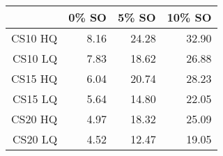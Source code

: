 \begin{table}[ht]
\begin{center}
\begin{tabular}{rrrr}
  \hline
 & 0\% SO & 5\% SO & 10\% SO \\
  \hline
CS10 HQ & 8.16 & 24.28 & 32.90 \\
  CS10 LQ & 7.83 & 18.62 & 26.88 \\
  CS15 HQ & 6.04 & 20.74 & 28.23 \\
  CS15 LQ & 5.64 & 14.80 & 22.05 \\
  CS20 HQ & 4.97 & 18.32 & 25.09 \\
  CS20 LQ & 4.52 & 12.47 & 19.05 \\
   \hline
\end{tabular}
\end{center}
\end{table}

